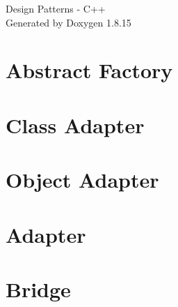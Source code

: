 \let\mypdfximage\pdfximage\def\pdfximage{\immediate\mypdfximage}\documentclass[twoside]{book}
\newcommand{\+}{\discretionary{\mbox{\scriptsize$\hookleftarrow$}}{}{}}
\newcommand{\clearemptydoublepage}{%
  \newpage{\pagestyle{empty}\cleardoublepage}%
}
\begin{document}
\hypersetup{pageanchor=false,
             bookmarksnumbered=true,
             pdfencoding=unicode
            }
\begin{titlepage}
\vspace*{7cm}
\begin{center}%
{\Large Design Patterns -\/ C++ }\\
\vspace*{1cm}
{\large Generated by Doxygen 1.8.15}\\
\end{center}
\end{titlepage}
\clearemptydoublepage
{}
\tableofcontents
\clearemptydoublepage
{}
\hypersetup{pageanchor=true}

\chapter{Abstract Factory}
\label{md__d_1__g_i_t__practice__design_patterns__abstract_factory__r_e_a_d_m_e}

\chapter{Class Adapter}
\label{md__d_1__g_i_t__practice__design_patterns__adapter__class_adapter__r_e_a_d_m_e}

\chapter{Object Adapter}
\label{md__d_1__g_i_t__practice__design_patterns__adapter__object_adapter__r_e_a_d_m_e}

\chapter{Adapter}
\label{md__d_1__g_i_t__practice__design_patterns__adapter__r_e_a_d_m_e}

\chapter{Bridge}
\label{md__d_1__g_i_t__practice__design_patterns__bridge__r_e_a_d_m_e}

\end{document}
